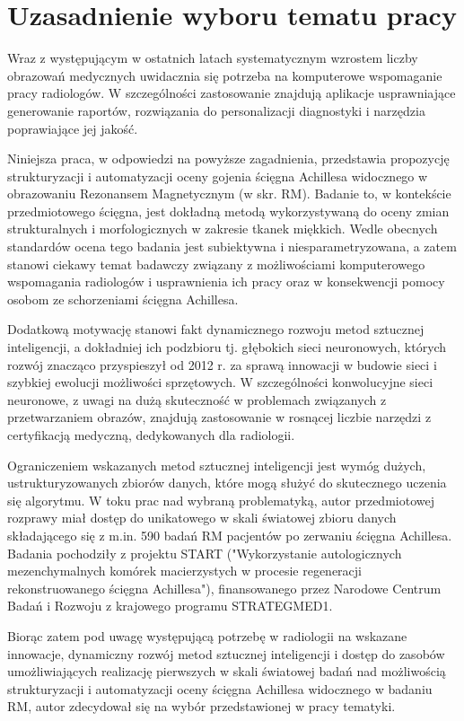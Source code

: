 {\let\clearpage\relax\chapter*{Uzasadnienie wyboru tematu pracy}}

Wraz z występującym w ostatnich latach systematycznym wzrostem liczby obrazowań medycznych uwidacznia się potrzeba na komputerowe wspomaganie pracy radiologów. W szczególności zastosowanie znajdują aplikacje usprawniające generowanie raportów, rozwiązania do personalizacji diagnostyki i narzędzia poprawiające jej jakość.

Niniejsza praca, w odpowiedzi na powyższe zagadnienia, przedstawia propozycję strukturyzacji i automatyzacji oceny gojenia ścięgna Achillesa widocznego w obrazowaniu Rezonansem Magnetycznym (w skr. RM). Badanie to, w kontekście przedmiotowego ścięgna, jest dokładną metodą wykorzystywaną do oceny zmian strukturalnych i morfologicznych w zakresie tkanek miękkich. Wedle obecnych standardów ocena tego badania jest subiektywna i niesparametryzowana, a zatem stanowi ciekawy temat badawczy związany z możliwościami komputerowego wspomagania radiologów i usprawnienia ich pracy oraz w konsekwencji pomocy osobom ze schorzeniami ścięgna Achillesa.

Dodatkową motywację stanowi fakt dynamicznego rozwoju metod sztucznej inteligencji, a dokładniej ich podzbioru tj. głębokich sieci neuronowych, których rozwój znacząco przyspieszył od 2012 r. za sprawą innowacji w budowie sieci i szybkiej ewolucji możliwości sprzętowych. W szczególności konwolucyjne sieci neuronowe, z uwagi na dużą skuteczność w problemach związanych z przetwarzaniem obrazów, znajdują zastosowanie w rosnącej liczbie narzędzi z certyfikacją medyczną, dedykowanych dla radiologii.

Ograniczeniem wskazanych metod sztucznej inteligencji jest wymóg dużych, ustrukturyzowanych zbiorów danych, które mogą służyć do skutecznego uczenia się algorytmu. W toku prac nad wybraną problematyką, autor przedmiotowej rozprawy miał dostęp do unikatowego w skali światowej zbioru danych składającego się z m.in. 590 badań RM pacjentów po zerwaniu ścięgna Achillesa. Badania pochodziły z projektu START ("Wykorzystanie autologicznych mezenchymalnych komórek macierzystych w procesie regeneracji rekonstruowanego ścięgna Achillesa"), finansowanego przez Narodowe Centrum Badań i Rozwoju z krajowego programu STRATEGMED1.

Biorąc zatem pod uwagę występującą potrzebę w radiologii na wskazane innowacje, dynamiczny rozwój metod sztucznej inteligencji i dostęp do zasobów umożliwiających realizację pierwszych w skali światowej badań nad możliwością strukturyzacji i automatyzacji oceny ścięgna Achillesa widocznego w badaniu RM, autor zdecydował się na wybór przedstawionej w pracy tematyki.  
 

